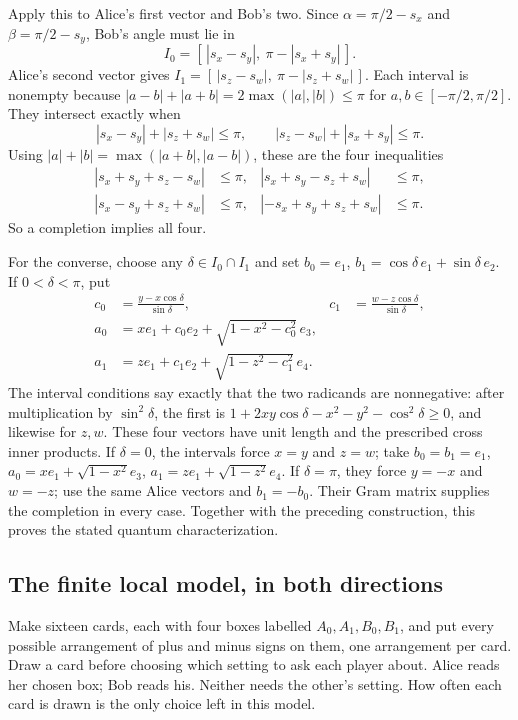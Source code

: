 \documentclass[11pt,twoside]{article}
\theoremstyle{thielethm}
\theoremstyle{thieledef}
\theoremstyle{thieledef}
\theoremstyle{thieledef}
\theoremstyle{thielethm}
\theoremstyle{thieleobs}
\theoremstyle{thielethm}
\begin{document}
Apply this to Alice's first vector and Bob's two. Since
$\alpha=\pi/2-s_x$ and $\beta=\pi/2-s_y$, Bob's angle must lie in
\[
I_0=[\,|s_x-s_y|,\ \pi-|s_x+s_y|\,].
\]
Alice's second vector gives
$I_1=[\,|s_z-s_w|,\ \pi-|s_z+s_w|\,]$.
Each interval is nonempty because $|a-b|+|a+b|=2\max(|a|,|b|)\le\pi$
for $a,b\in[-\pi/2,\pi/2]$. They intersect exactly when
\[
|s_x-s_y|+|s_z+s_w|\le\pi,\qquad
|s_z-s_w|+|s_x+s_y|\le\pi.
\]
Using $|a|+|b|=\max(|a+b|,|a-b|)$, these are the four inequalities
\[
\begin{aligned}
|s_x+s_y+s_z-s_w|&\le\pi,&|s_x+s_y-s_z+s_w|&\le\pi,\\
|s_x-s_y+s_z+s_w|&\le\pi,&|-s_x+s_y+s_z+s_w|&\le\pi.
\end{aligned}
\]
So a completion implies all four.

For the converse, choose any $\delta\in I_0\cap I_1$ and set
$b_0=e_1$, $b_1=\cos\delta\,e_1+\sin\delta\,e_2$.
If $0<\delta<\pi$, put
\[
\begin{aligned}
c_0&=\frac{y-x\cos\delta}{\sin\delta},&
c_1&=\frac{w-z\cos\delta}{\sin\delta},\\
a_0&=xe_1+c_0e_2+\sqrt{1-x^2-c_0^2}\,e_3,\\
a_1&=ze_1+c_1e_2+\sqrt{1-z^2-c_1^2}\,e_4.
\end{aligned}
\]
The interval conditions say exactly that the two radicands are nonnegative:
after multiplication by $\sin^2\delta$, the first is
$1+2xy\cos\delta-x^2-y^2-\cos^2\delta\ge0$, and likewise for $z,w$.
These four vectors have unit length and the prescribed cross inner products.
If $\delta=0$, the intervals force $x=y$ and $z=w$; take $b_0=b_1=e_1$,
$a_0=xe_1+\sqrt{1-x^2}e_3$, $a_1=ze_1+\sqrt{1-z^2}e_4$.
If $\delta=\pi$, they force $y=-x$ and $w=-z$; use the same Alice vectors and
$b_1=-b_0$. Their Gram matrix supplies the completion in every case.
Together with the preceding construction, this proves the stated quantum characterization.

\subsection{The finite local model, in both directions}


Make sixteen cards, each with four boxes labelled $A_0,A_1,B_0,B_1$, and put every
possible arrangement of plus and minus signs on them, one arrangement per card.
Draw a card before choosing which setting to ask each player about. Alice reads
her chosen box; Bob reads his. Neither needs the other's setting. How often each
card is drawn is the only choice left in this model.
\end{document}
